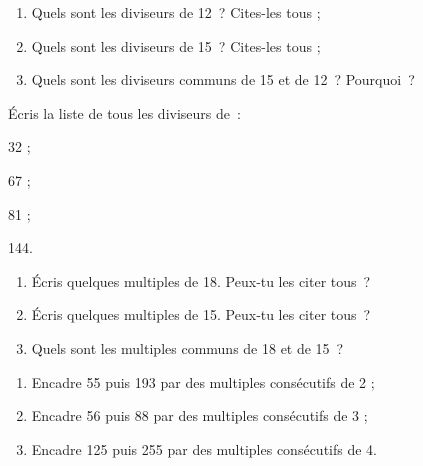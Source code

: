 \begin{exercice}
\begin{enumerate}
 \item Quels sont les diviseurs de 12 ? Cites-les tous ;
 \item Quels sont les diviseurs de 15 ? Cites-les tous ;
 \item Quels sont les diviseurs communs de 15 et de 12 ? Pourquoi ?
 \end{enumerate}
\end{exercice} 

\begin{exercice}
Écris la liste de tous les diviseurs de :
\begin{colenumerate}{4}
 \item 32 ;
 \item 67 ;
 \item 81 ;
 \item 144.
 \end{colenumerate}
\end{exercice} 

\begin{exercice}
\begin{enumerate}
 \item Écris quelques multiples de 18. Peux‑tu les citer tous ?
 \item Écris quelques multiples de 15. Peux‑tu les citer tous ?
 \item Quels sont les multiples communs de 18 et de 15 ?
 \end{enumerate}
\end{exercice} 

\begin{exercice}[Encadrement]
\begin{enumerate}
 \item Encadre 55 puis 193 par des multiples consécutifs de 2 ;
 \item Encadre 56 puis 88 par des multiples consécutifs de 3 ;
 \item Encadre 125 puis 255 par des multiples consécutifs de 4.
 \end{enumerate}
\end{exercice} 




